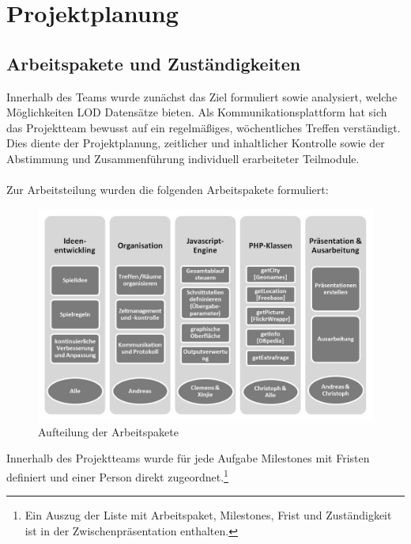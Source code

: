 \documentclass[a4paper, 11pt]{article}
\begin{document}
\section{Projektplanung}
\subsection{Arbeitspakete und Zuständigkeiten}
Innerhalb des Teams wurde zunächst das Ziel formuliert sowie analysiert, welche Möglichkeiten LOD Datensätze bieten. Als Kommunikationsplattform hat sich das Projektteam bewusst auf ein regelmäßiges, wöchentliches Treffen verständigt. Dies diente der Projektplanung, zeitlicher und inhaltlicher Kontrolle sowie der Abstimmung und Zusammenführung individuell erarbeiteter Teilmodule.\\\\
Zur Arbeitsteilung wurden die folgenden Arbeitspakete formuliert:
\begin{figure}[H]
	\centering
	\includegraphics[width=1.0\columnwidth, angle=0]{projektplanung_organigramm_sw.png}
	\caption{Aufteilung der Arbeitspakete}
	\label{img:grafik-dummy}
\end{figure}
Innerhalb des Projektteams wurde für jede Aufgabe Milestones mit Fristen definiert und einer Person direkt zugeordnet.\footnote{Ein Auszug der Liste mit Arbeitspaket, Milestones, Frist und Zuständigkeit ist in der Zwischenpräsentation enthalten.}
\end{document}
